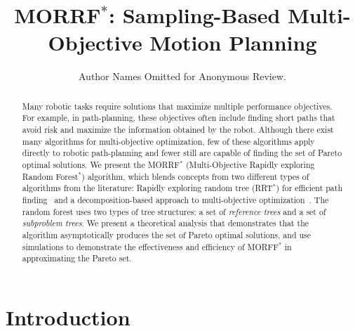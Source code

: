 \documentclass{article}
\title{ MORRF$^*$: Sampling-Based Multi-Objective Motion Planning }
\author{Author Names Omitted for Anonymous Review.}
\begin{document}
\maketitle

\begin{abstract}
Many robotic tasks require solutions that maximize multiple performance objectives.  
For example, in path-planning, these objectives often include finding short paths that avoid risk and maximize the information obtained by the robot.  
Although there exist many algorithms for multi-objective optimization, few of these algorithms apply directly to robotic path-planning and fewer still are capable of finding the set of Pareto optimal solutions.  
We present the MORRF$^{*}$ (Multi-Objective Rapidly exploring Random Forest$^{*}$) algorithm, which blends concepts from two different types of algorithms from the literature: Rapidly exploring random tree (RRT$^{*}$) for efficient path finding~\cite{Karaman.Frazzoli:RSS10} and a decomposition-based approach to multi-objective optimization~\cite{4358754}.  
The random forest uses two types of tree structures: a set of {\em reference trees} and a set of {\em subproblem trees}.  
We present a theoretical analysis that demonstrates that the algorithm asymptotically produces the set of Pareto optimal solutions, and use simulations to demonstrate the effectiveness and efficiency of MORFF$^{*}$ in approximating the Pareto set.
\end{abstract}

\section{Introduction}
\label{sec:intro}
\end{document}
